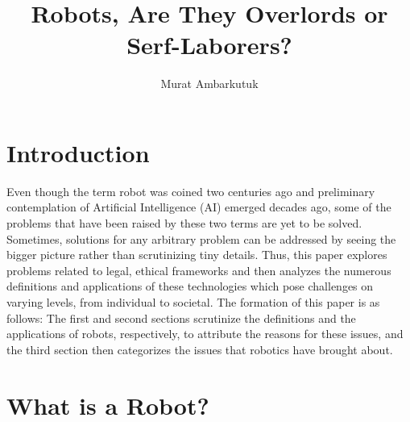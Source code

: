 \documentclass[man]{apa6}
\title{Robots, Are They Overlords or Serf-Laborers?}
\author{Murat Ambarkutuk}
\affiliation{English Language Institute, University of Delaware \\ murata@udel.
edu}
\begin{document}
\maketitle

\section{Introduction}
Even though the term robot was coined two centuries ago and preliminary contemplation of Artificial Intelligence (AI) emerged decades ago, some of the problems that have been raised by these two terms are yet to be solved.
Sometimes, solutions for any arbitrary problem can be addressed by seeing the bigger picture rather than scrutinizing tiny details.
Thus, this paper explores problems related to legal, ethical frameworks and then analyzes the numerous definitions and applications of these technologies which pose challenges on varying levels, from individual to societal.
The formation of this paper is as follows: The first and second sections scrutinize the definitions and the applications of robots, respectively, to attribute the reasons for these issues, and the third section then categorizes the issues that robotics have brought about.

\section{What is a Robot?}
\par
\end{document}
